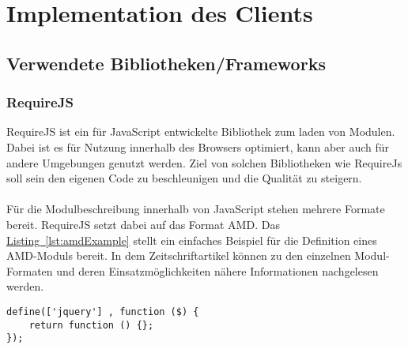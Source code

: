 
\chapter{Implementation des Clients}
\section{Verwendete Bibliotheken/Frameworks}

\subsection{RequireJS}\label{sec:requireJs}
RequireJS ist ein für JavaScript entwickelte Bibliothek zum laden von Modulen. Dabei ist es für Nutzung innerhalb des Browsers optimiert, kann aber auch für andere Umgebungen genutzt werden. Ziel von solchen Bibliotheken wie RequireJs soll sein den eigenen Code zu beschleunigen und die Qualität zu steigern.\cite{requirejs}\\
\\
Für die Modulbeschreibung innerhalb von JavaScript stehen mehrere Formate bereit. RequireJS setzt dabei auf das Format \gls{AMD}. Das \hyperref[lst:amdExample]{Listing~\ref{lst:amdExample}} stellt ein einfaches Beispiel für die Definition eines \gls{AMD}-Moduls bereit. In dem Zeitschriftartikel \cite{jsModuleDefinitions} können zu den einzelnen Modul-Formaten und deren Einsatzmöglichkeiten nähere Informationen nachgelesen werden.
\begin{lstlisting}[style=lstStyleFramed, caption={Beispiel: Moduldefinition mittels \acrfull{AMD} \cite{requirejsExample}}, label=lst:amdExample]
define(['jquery'] , function ($) {
	return function () {};
});
\end{lstlisting}

